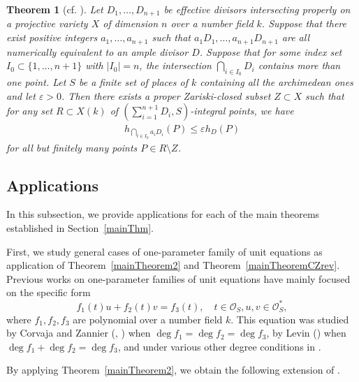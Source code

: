 \documentclass[10pt]{amsart}
\numberwithin{equation}{section}
\theoremstyle{plain}
\newtheorem{theorem}{Theorem}[section]
\theoremstyle{definition}
\begin{document}
\begin{theorem}[cf. {\cite[Theorems 1.10]{WX2025}}]\label{MainThmgcd}
Let $D_1, \ldots,D_{n+1}$ be effective  divisors intersecting properly on a  projective variety $X$ of dimension $n$ over a number field $k$. Suppose that there exist positive integers $a_1,\ldots, a_{n+1}$ such that $a_1D_1, \ldots, a_{n+1}D_{n+1}$ are all numerically equivalent to an ample divisor $D$.  
Suppose that for some index set $I_0 \subset \{1,\ldots,n+1\}$ with $|I_0|=n$, the intersection $\bigcap_{i\in I_0}D_i$ contains more than one point. 
Let $S$ be a finite set of places of $k$ containing all the archimedean ones and let $\varepsilon > 0$. Then  there exists a proper Zariski-closed subset $Z\subset X$ such that for any set $R\subset X(k)$ of $(\sum_{i=1}^{n+1}D_i, S)$-integral points, we have 
\begin{align*}
h_{\bigcap_{i \in I_0}a_iD_i}(P) 
        \le \varepsilon h_D(P)  
\end{align*}
for all but finitely many points $P\in R\setminus Z$.
\end{theorem}
\subsection{Applications}
In this subsection, we provide applications for each of the main theorems established in Section~\ref{mainThm}.

First, we study general cases of  one-parameter family of unit equations as application of Theorem~\ref{mainTheorem2} and Theorem~\ref{mainTheoremCZrev}. Previous works on one-parameter families of unit equations have mainly focused on the specific form
\[f_1(t)u+f_2(t)v=f_3(t),\quad t\in\mathcal O_S, u,v\in \mathcal O_S^*, \]
where $f_1,f_2,f_3$ are polynomial over a number field $k$.
This equation was studied by Corvaja and Zannier (\cite{CZ2006}, \cite{CZ2010}) when $\deg f_1=\deg f_2=\deg f_3$,  by Levin (\cite{Levin06}) when $\deg f_1+\deg f_2=\deg f_3$, and under various other degree conditions in \cite{HLX}.  


By applying Theorem~\ref{mainTheorem2}, we obtain the following extension of \cite[Theorem 1.6]{HLX}.
 
\end{document}
